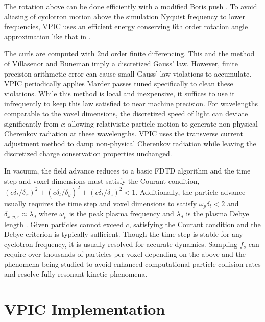 \documentclass[letter,10pt]{article}
\begin{document}
The rotation above can be done efficiently with a modified Boris push
\cite{Boris_1970}.  To avoid aliasing of cyclotron motion above the
simulation Nyquist frequency to lower frequencies, VPIC uses an
efficient energy conserving 6th order rotation angle approximation
like that in \cite{Blahovec_et_al_2000}.

The curls are computed with 2nd order finite differencing.  This and
the method of Villasenor and Buneman imply a discretized Gauss' law.
However, finite precision arithmetic error can cause small Gauss' law
violations to accumulate.  VPIC periodically applies Marder passes
\cite{Marder_1987} tuned specifically to clean these violations.
While this method is local and inexpensive, it suffices to use it
infrequently to keep this law satisfied to near machine precision.
For wavelengths comparable to the voxel dimensions, the discretized
speed of light can deviate significantly from $c$; allowing
relativistic particle motion to generate non-physical Cherenkov
radiation at these wavelengths.  VPIC uses the transverse current
adjustment method \cite{Eastwood_et_al_1995} to damp non-physical
Cherenkov radiation while leaving the discretized charge conservation
properties unchanged.

In vacuum, the field advance reduces to a basic FDTD algorithm
\cite{Yee_1966} and the time step and voxel dimensions must satisfy the
Courant condition,
$\left(c\delta_t/\delta_x\right)^2 +
 \left(c\delta_t/\delta_y\right)^2 +
 \left(c\delta_t/\delta_z\right)^2 < 1$.
Additionally, the particle advance usually requires the time
step and voxel dimensions to satisfy $\omega_p \delta_t < 2$ and
$\delta_{x,y,z}
\approx \lambda_d$ where $\omega_p$ is the peak plasma frequency and
$\lambda_d$ is the plasma Debye length
\cite{Birdsall_Langdon_1985,Hockney_Eastwood_1988}.
Given particles cannot exceed $c$, satisfying the Courant condition
and the Debye criterion is typically sufficient.  Though the time step
is stable for any cyclotron frequency, it is usually resolved for
accurate dynamics.  Sampling $f_s$ can require over thousands of
particles per voxel depending on the above and the phenomena being
studied to avoid enhanced computational particle collision rates and
resolve fully resonant kinetic phenomena.

\section{VPIC Implementation}
\end{document}
